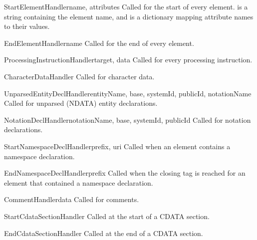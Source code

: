 \begin{methoddesc}{StartElementHandler}{name, attributes}
Called for the start of every element.   is a string
containing the element name, and  is a dictionary
mapping attribute names to their values.
\end{methoddesc}

\begin{methoddesc}{EndElementHandler}{name}
Called for the end of every element.
\end{methoddesc}

\begin{methoddesc}{ProcessingInstructionHandler}{target, data}
Called for every processing instruction.  
\end{methoddesc}

\begin{methoddesc}{CharacterDataHandler}{}
Called for character data.  
\end{methoddesc}

\begin{methoddesc}{UnparsedEntityDeclHandler}{entityName, base, systemId, publicId, notationName}
Called for unparsed (NDATA) entity declarations.
\end{methoddesc}

\begin{methoddesc}{NotationDeclHandler}{notationName, base, systemId, publicId}
Called for notation declarations.
\end{methoddesc}

\begin{methoddesc}{StartNamespaceDeclHandler}{prefix, uri}
Called when an element contains a namespace declaration.
\end{methoddesc}

\begin{methoddesc}{EndNamespaceDeclHandler}{prefix}
Called when the closing tag is reached for an element 
that contained a namespace declaration.
\end{methoddesc}

\begin{methoddesc}{CommentHandler}{data}
Called for comments.
\end{methoddesc}

\begin{methoddesc}{StartCdataSectionHandler}{}
Called at the start of a CDATA section.
\end{methoddesc}

\begin{methoddesc}{EndCdataSectionHandler}{}
Called at the end of a CDATA section.
\end{methoddesc}

